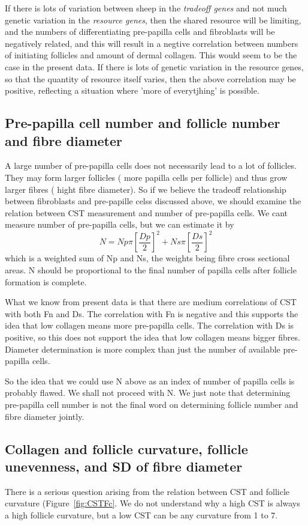 \documentclass[titlepage]{article}  %
\begin{document}
If there is lots of variation between sheep in the {\em tradeoff genes} and not much genetic variation in the {\em resource genes}, then the shared resource will be limiting, and the numbers of differentiating pre-papilla cells and fibroblasts will be negatively related, and this will result in a negtive correlation between numbers of initiating follicles and amount of dermal collagen. This would seem to be the case in the present data. If there is lots of genetic variation in the resource genes, so that the quantity of resource itself varies, then the above correlation may be positive, reflecting a situation where 'more of everytjhing' is possible. 

\subsection{Pre-papilla cell number and follicle number and fibre diameter}
A large number of pre-papilla cells does not necessarily lead to a lot of follicles. They may form larger follicles ( more papilla cells per follicle) and thus grow larger fibres ( hight fibre diameter).
So if we believe the tradeoff relationship between fibroblasts and pre-papille celss discussed above, we should examine the relation between CST measurement  and number of pre-papilla cells. We cant measure number of pre-papilla cells, but we can estimate it by
\begin{displaymath}
N = Np \pi \left[\frac{Dp}{2}\right]^2 + Ns \pi \left[\frac{Ds}{2}\right]^2
\end{displaymath}
which is a weighted sum of Np and Ns, the weights being fibre cross sectional areas. N should be proportional to the final number of papilla cells after follicle formation is complete.

What we know from present data is that there are medium correlations of CST with both Fn and Ds. The correlation with Fn is negative and this supports the idea that low collagen means more pre-papilla cells. The correlation with Ds is positive, so this does not support the idea that low collagen means bigger fibres. Diameter determination is more complex than just the number of available pre-papilla cells. 

So the idea that we could use N above as an index of number of papilla cells is probably flawed. We shall not proceed with N. We just note that determining pre-papilla cell number is not the final word on determining follicle number and fibre diameter jointly.

\subsection{Collagen and follicle curvature, follicle unevenness, and SD of fibre diameter}
There is a serious  question arising from the relation between CST and follicle curvature (Figure~\ref{fig:CSTFc}. We do not understand why a high CST is always a high follicle curvature, but a low CST can be any curvature from 1 to 7. 
\end{document}
